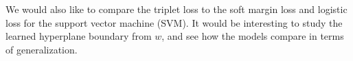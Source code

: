 \documentclass[11pt]{article}
\begin{document}
We would also like to compare the triplet loss to the soft margin loss and logistic loss for the support vector machine (SVM). It would be interesting to study the learned hyperplane boundary from $w$, and see how the models compare in terms of generalization.





\end{document}
